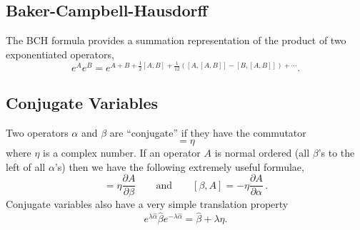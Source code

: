 \subsection{Baker-Campbell-Hausdorff}

The BCH formula provides a summation representation of the product of two exponentiated operators,
\begin{equation}
e^{A}e^{B}=e^{A+B+\frac{1}{2}[A,B]+\frac{1}{12}\left([A,[A,B]]-[B,[A,B]]\right)+\cdots}. \end{equation}

\subsection{Conjugate Variables}

Two operators $\alpha$ and $\beta$ are ``conjugate'' if they have the commutator
\begin{equation}
  [\alpha,\beta]=\eta
\end{equation}
where $\eta$ is a complex number.
If an operator $A$ is normal ordered (all $\beta$'s to the left of all $\alpha$'s) then we have the following extremely useful formulae,
\begin{equation}
  [\alpha,A] = \eta\frac{\partial A}{\partial\beta}
  \qquad\textrm{and}\qquad
  [\beta,A]=-\eta\frac{\partial A}{\partial\alpha}
  \, .
\end{equation}
Conjugate variables also have a very simple translation property
\begin{equation}
  e^{\lambda \hat{\alpha}}\hat{\beta}e^{-\lambda \hat{\alpha}}=\hat{\beta} + \lambda \eta.
\end{equation}

